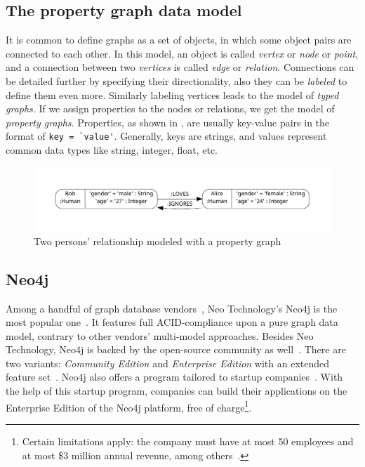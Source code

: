 \subsection{The property graph data model}

It is common to define graphs as a set of objects, in which some object pairs are connected to each other. In this model, an object is called \emph{vertex} or \emph{node} or \emph{point}, and a connection between two \emph{vertices} is called \emph{edge} or \emph{relation}. Connections can be detailed further by specifying their directionality, also they can be \emph{labeled} to define them even more. Similarly labeling vertices leads to the model of \emph{typed graphs}. If we assign properties to the nodes or relations, we get the model of \emph{property graphs}. Properties, as shown in , are usually key-value pairs in the format of \lstinline{key = `value'}. Generally, keys are strings, and values represent common data types like string, integer, float, etc.

\begin{figure}[!htb]
    \centering
    \includegraphics[width=\textwidth, trim=12mm 12mm 12mm 12mm,clip]{figures/property-graph.pdf}
    \caption{Two persons' relationship modeled with a property graph}
    \label{fig:property-graph}
\end{figure}

\subsection{Neo4j}

Among a handful of graph database vendors~\cite{graph-dbs}, Neo Technology's Neo4j is the most popular one~\cite{graph-dbs-raking}. It features full ACID-compliance upon a pure graph data model, contrary to other vendors' multi-model approaches. Besides Neo Technology, Neo4j is backed by the open-source community as well~\cite{neo4j-github}. There are two variants: \emph{Community Edition} and \emph{Enterprise Edition} with an extended feature set~\cite{neo4j-licensing}. Neo4j also offers a program tailored to startup companies~\cite{neo4j-startup-program}. With the help of this startup program, companies can build their applications on the Enterprise Edition of the Neo4j platform, free of charge\footnote{Certain limitations apply: the company must have at most 50 employees and at most \$3 million annual revenue, among others~\cite{neo4j-startup-program}.}.

